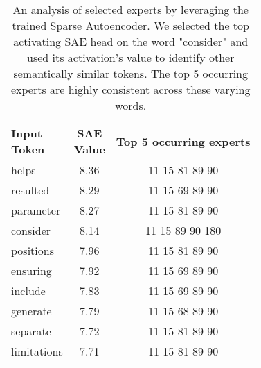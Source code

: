\begin{table}[]
    \centering
    \begin{tabular}{lcc}
        \makecell{Input \\ Token} & \makecell{SAE \\ Value}  & Top 5 occurring experts \\
        \toprule
         helps & 8.36 & 11 \hfill 15 \hfill 81 \hfill 89 \hfill 90 \\
         resulted & 8.29 & 11 \hfill 15 \hfill 69 \hfill 89 \hfill 90 \\
         parameter & 8.27 & 11 \hfill 15 \hfill 81 \hfill 89 \hfill 90 \\
         consider & 8.14 & 11 \hfill 15 \hfill 89 \hfill 90 \hfill 180 \\
         positions & 7.96 & 11 \hfill 15 \hfill 81 \hfill 89 \hfill 90 \\
         ensuring & 7.92 & 11 \hfill 15 \hfill 69 \hfill 89 \hfill 90 \\
         include & 7.83 & 11 \hfill 15 \hfill 69 \hfill 89 \hfill 90 \\
         generate & 7.79 & 11 \hfill 15 \hfill 68 \hfill 89 \hfill 90 \\
         separate & 7.72 & 11 \hfill 15 \hfill 81 \hfill 89 \hfill 90 \\
         limitations & 7.71 & 11 \hfill 15 \hfill 81 \hfill 89 \hfill 90 \\
        \bottomrule
    \end{tabular}
    \caption{An analysis of selected experts by leveraging the trained Sparse Autoencoder. We selected the top activating SAE head on the word "consider" and used its activation's value to identify other semantically similar tokens. The top 5 occurring experts are highly consistent across these varying words.}
    \label{tab:sae_consider}
\end{table}

